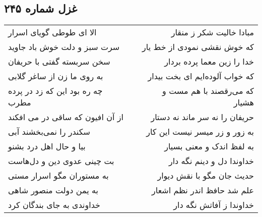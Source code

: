 \begin{center}
\section*{غزل شماره ۲۴۵}
\label{sec:sh245}
\begin{longtable}{l p{0.5cm} r}
الا ای طوطی گویای اسرار
&&
مبادا خالیت شکر ز منقار
\\
سرت سبز و دلت خوش باد جاوید
&&
که خوش نقشی نمودی از خط یار
\\
سخن سربسته گفتی با حریفان
&&
خدا را زین معما پرده بردار
\\
به روی ما زن از ساغر گلابی
&&
که خواب آلوده‌ایم ای بخت بیدار
\\
چه ره بود این که زد در پرده مطرب
&&
که می‌رقصند با هم مست و هشیار
\\
از آن افیون که ساقی در می افکند
&&
حریفان را نه سر ماند نه دستار
\\
سکندر را نمی‌بخشند آبی
&&
به زور و زر میسر نیست این کار
\\
بیا و حال اهل درد بشنو
&&
به لفظ اندک و معنی بسیار
\\
بت چینی عدوی دین و دل‌هاست
&&
خداوندا دل و دینم نگه دار
\\
به مستوران مگو اسرار مستی
&&
حدیث جان مگو با نقش دیوار
\\
به یمن دولت منصور شاهی
&&
علم شد حافظ اندر نظم اشعار
\\
خداوندی به جای بندگان کرد
&&
خداوندا ز آفاتش نگه دار
\\
\end{longtable}
\end{center}
